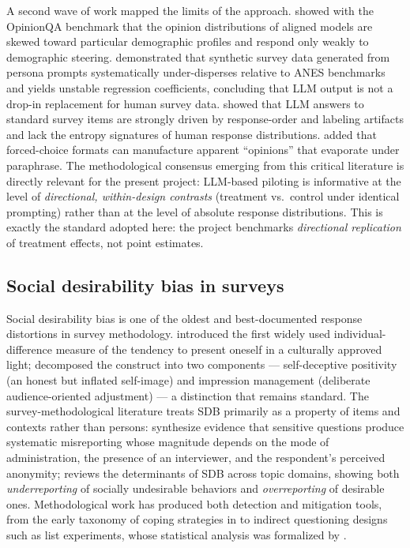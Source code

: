 \documentclass[14pt,a4paper]{extarticle}
\begin{document}
A second wave of work mapped the limits of the approach. \cite{santurkar2023} showed with the OpinionQA benchmark that the opinion distributions of aligned models are skewed toward particular demographic profiles and respond only weakly to demographic steering. \cite{bisbee2024} demonstrated that synthetic survey data generated from persona prompts systematically under-disperses relative to ANES benchmarks and yields unstable regression coefficients, concluding that LLM output is not a drop-in replacement for human survey data. \cite{dominguez2024} showed that LLM answers to standard survey items are strongly driven by response-order and labeling artifacts and lack the entropy signatures of human response distributions. \cite{rottger2024} added that forced-choice formats can manufacture apparent ``opinions'' that evaporate under paraphrase. The methodological consensus emerging from this critical literature is directly relevant for the present project: LLM-based piloting is informative at the level of \emph{directional, within-design contrasts} (treatment vs.\ control under identical prompting) rather than at the level of absolute response distributions. This is exactly the standard adopted here: the project benchmarks \emph{directional replication} of treatment effects, not point estimates.

\subsection{Social desirability bias in surveys}

Social desirability bias is one of the oldest and best-documented response distortions in survey methodology. \cite{crowne1960} introduced the first widely used individual-difference measure of the tendency to present oneself in a culturally approved light; \cite{paulhus1984} decomposed the construct into two components --- self-deceptive positivity (an honest but inflated self-image) and impression management (deliberate audience-oriented adjustment) --- a distinction that remains standard. The survey-methodological literature treats SDB primarily as a property of items and contexts rather than persons: \cite{tourangeau2007} synthesize evidence that sensitive questions produce systematic misreporting whose magnitude depends on the mode of administration, the presence of an interviewer, and the respondent's perceived anonymity; \cite{krumpal2013} reviews the determinants of SDB across topic domains, showing both \emph{underreporting} of socially undesirable behaviors and \emph{overreporting} of desirable ones. Methodological work has produced both detection and mitigation tools, from the early taxonomy of coping strategies in \cite{nederhof1985} to indirect questioning designs such as list experiments, whose statistical analysis was formalized by \cite{blair2012}.
\end{document}
